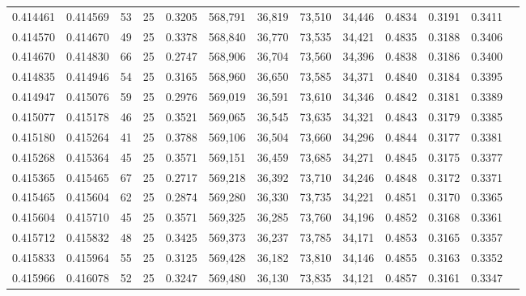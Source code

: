 \begin{tabular}{rrrrrrrrrrrrr}
0.414461 & 0.414569 &    53 &  25 &                                     0.3205 & 568,791 &  36,819 &  73,510 &  34,446 & 0.4834 & 0.3191 & 0.3411 \\
0.414570 & 0.414670 &    49 &  25 &                                     0.3378 & 568,840 &  36,770 &  73,535 &  34,421 & 0.4835 & 0.3188 & 0.3406 \\
0.414670 & 0.414830 &    66 &  25 &                                     0.2747 & 568,906 &  36,704 &  73,560 &  34,396 & 0.4838 & 0.3186 & 0.3400 \\
0.414835 & 0.414946 &    54 &  25 &                                     0.3165 & 568,960 &  36,650 &  73,585 &  34,371 & 0.4840 & 0.3184 & 0.3395 \\
0.414947 & 0.415076 &    59 &  25 &                                     0.2976 & 569,019 &  36,591 &  73,610 &  34,346 & 0.4842 & 0.3181 & 0.3389 \\
0.415077 & 0.415178 &    46 &  25 &                                     0.3521 & 569,065 &  36,545 &  73,635 &  34,321 & 0.4843 & 0.3179 & 0.3385 \\
0.415180 & 0.415264 &    41 &  25 &                                     0.3788 & 569,106 &  36,504 &  73,660 &  34,296 & 0.4844 & 0.3177 & 0.3381 \\
0.415268 & 0.415364 &    45 &  25 &                                     0.3571 & 569,151 &  36,459 &  73,685 &  34,271 & 0.4845 & 0.3175 & 0.3377 \\
0.415365 & 0.415465 &    67 &  25 &                                     0.2717 & 569,218 &  36,392 &  73,710 &  34,246 & 0.4848 & 0.3172 & 0.3371 \\
0.415465 & 0.415604 &    62 &  25 &                                     0.2874 & 569,280 &  36,330 &  73,735 &  34,221 & 0.4851 & 0.3170 & 0.3365 \\
0.415604 & 0.415710 &    45 &  25 &                                     0.3571 & 569,325 &  36,285 &  73,760 &  34,196 & 0.4852 & 0.3168 & 0.3361 \\
0.415712 & 0.415832 &    48 &  25 &                                     0.3425 & 569,373 &  36,237 &  73,785 &  34,171 & 0.4853 & 0.3165 & 0.3357 \\
0.415833 & 0.415964 &    55 &  25 &                                     0.3125 & 569,428 &  36,182 &  73,810 &  34,146 & 0.4855 & 0.3163 & 0.3352 \\
0.415966 & 0.416078 &    52 &  25 &                                     0.3247 & 569,480 &  36,130 &  73,835 &  34,121 & 0.4857 & 0.3161 & 0.3347 \\

\end{tabular}
